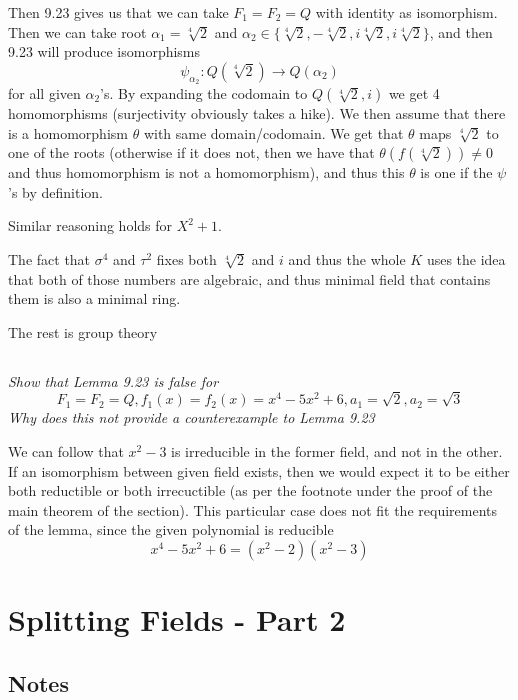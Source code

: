 \documentclass[11pt,oneside,titlepage]{book}
\newcommand{\set}[1]{\{ #1 \}}
\begin{document}
Then 9.23 gives us that we can take $F_1 = F_2 = Q$ with identity as
isomorphism. Then we can take root $\alpha_1 = \sqrt[4]{2}$ and
$\alpha_2 \in \set{\sqrt[4]{2}, -\sqrt[4]{2}, i\sqrt[4]{2},
i\sqrt[4]{2}}$, and then 9.23 will produce isomorphisms
$$\psi_{\alpha_2}: Q(\sqrt[4]{2}) \to Q(\alpha_2)$$
for all given $\alpha_2$'s. By expanding the codomain to
$Q(\sqrt[4]{2}, i)$ we get 4 homomorphisms (surjectivity obviously
takes a hike). We then assume that there is a homomorphism $\theta$
with same domain/codomain. We get that $\theta$ maps $\sqrt[4]{2}$ to
one of the roots (otherwise if it does not, then we have that
$\theta(f(\sqrt[4]{2})) \neq 0$ and thus homomorphism is not a
homomorphism), and thus this $\theta$ is one if the $\psi$'s by
definition.

Similar reasoning holds for $X^2 + 1$.

The fact that $\sigma^4$ and $\tau^2$ fixes both $\sqrt[4]{2}$ and $i$ and
thus the whole $K$ uses the idea that both of those numbers are algebraic,
and thus minimal field that contains them is also a minimal ring.

The rest is group theory


\subsection{}

\textit{Show that Lemma 9.23 is false for
  $$F_1 = F_2 = Q, f_1(x) = f_2(x) = x^4 - 5x^2 + 6, a_1 = \sqrt{2}, a_2 = \sqrt{3}$$
  Why does this not provide a counterexample to Lemma 9.23 }

We can follow that $x^2 - 3$ is irreducible in the former field, and
not in the other.  If an isomorphism between given field exists, then
we would expect it to be either both reductible or both irrecuctible
(as per the footnote under the proof of the main theorem of the
section).  This particular case does not fit the requirements of the
lemma, since the given polynomial is reducible
$$x^4 - 5x^2 + 6 = (x^2 - 2)(x^2 - 3)$$

\section{Splitting Fields - Part 2}

\subsection*{Notes}
\end{document}
